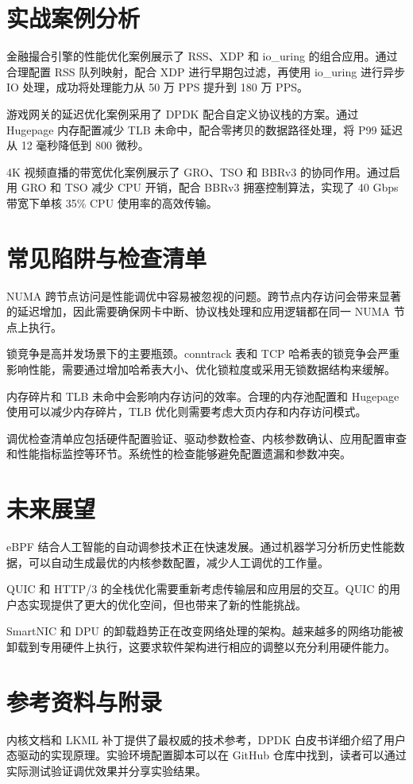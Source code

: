 \chapter{实战案例分析}
金融撮合引擎的性能优化案例展示了 RSS、XDP 和 io\_{}uring 的组合应用。通过合理配置 RSS 队列映射，配合 XDP 进行早期包过滤，再使用 io\_{}uring 进行异步 IO 处理，成功将处理能力从 50 万 PPS 提升到 180 万 PPS。\par
游戏网关的延迟优化案例采用了 DPDK 配合自定义协议栈的方案。通过 Hugepage 内存配置减少 TLB 未命中，配合零拷贝的数据路径处理，将 P99 延迟从 12 毫秒降低到 800 微秒。\par
4K 视频直播的带宽优化案例展示了 GRO、TSO 和 BBRv3 的协同作用。通过启用 GRO 和 TSO 减少 CPU 开销，配合 BBRv3 拥塞控制算法，实现了 40 Gbps 带宽下单核 35\%{} CPU 使用率的高效传输。\par
\chapter{常见陷阱与检查清单}
NUMA 跨节点访问是性能调优中容易被忽视的问题。跨节点内存访问会带来显著的延迟增加，因此需要确保网卡中断、协议栈处理和应用逻辑都在同一 NUMA 节点上执行。\par
锁竞争是高并发场景下的主要瓶颈。conntrack 表和 TCP 哈希表的锁竞争会严重影响性能，需要通过增加哈希表大小、优化锁粒度或采用无锁数据结构来缓解。\par
内存碎片和 TLB 未命中会影响内存访问的效率。合理的内存池配置和 Hugepage 使用可以减少内存碎片，TLB 优化则需要考虑大页内存和内存访问模式。\par
调优检查清单应包括硬件配置验证、驱动参数检查、内核参数确认、应用配置审查和性能指标监控等环节。系统性的检查能够避免配置遗漏和参数冲突。\par
\chapter{未来展望}
eBPF 结合人工智能的自动调参技术正在快速发展。通过机器学习分析历史性能数据，可以自动生成最优的内核参数配置，减少人工调优的工作量。\par
QUIC 和 HTTP/3 的全栈优化需要重新考虑传输层和应用层的交互。QUIC 的用户态实现提供了更大的优化空间，但也带来了新的性能挑战。\par
SmartNIC 和 DPU 的卸载趋势正在改变网络处理的架构。越来越多的网络功能被卸载到专用硬件上执行，这要求软件架构进行相应的调整以充分利用硬件能力。\par
\chapter{参考资料与附录}
内核文档和 LKML 补丁提供了最权威的技术参考，DPDK 白皮书详细介绍了用户态驱动的实现原理。实验环境配置脚本可以在 GitHub 仓库中找到，读者可以通过实际测试验证调优效果并分享实验结果。\par
